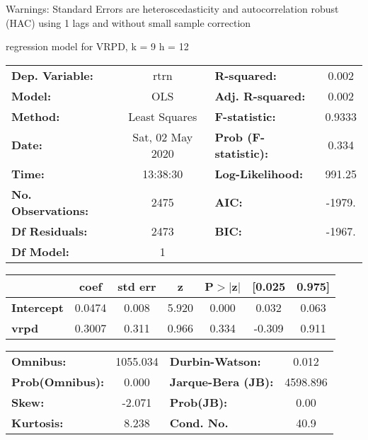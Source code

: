 Warnings: \newline
 [1] Standard Errors are heteroscedasticity and autocorrelation robust (HAC) using 1 lags and without small sample correction\ 

regression model for VRPD, k = 9 h = 12\begin{center}
\begin{tabular}{lclc}
\toprule
\textbf{Dep. Variable:}    &       rtrn       & \textbf{  R-squared:         } &     0.002   \\
\textbf{Model:}            &       OLS        & \textbf{  Adj. R-squared:    } &     0.002   \\
\textbf{Method:}           &  Least Squares   & \textbf{  F-statistic:       } &    0.9333   \\
\textbf{Date:}             & Sat, 02 May 2020 & \textbf{  Prob (F-statistic):} &    0.334    \\
\textbf{Time:}             &     13:38:30     & \textbf{  Log-Likelihood:    } &    991.25   \\
\textbf{No. Observations:} &        2475      & \textbf{  AIC:               } &    -1979.   \\
\textbf{Df Residuals:}     &        2473      & \textbf{  BIC:               } &    -1967.   \\
\textbf{Df Model:}         &           1      & \textbf{                     } &             \\
\bottomrule
\end{tabular}
\begin{tabular}{lcccccc}
                   & \textbf{coef} & \textbf{std err} & \textbf{z} & \textbf{P$> |$z$|$} & \textbf{[0.025} & \textbf{0.975]}  \\
\midrule
\textbf{Intercept} &       0.0474  &        0.008     &     5.920  &         0.000        &        0.032    &        0.063     \\
\textbf{vrpd}      &       0.3007  &        0.311     &     0.966  &         0.334        &       -0.309    &        0.911     \\
\bottomrule
\end{tabular}
\begin{tabular}{lclc}
\textbf{Omnibus:}       & 1055.034 & \textbf{  Durbin-Watson:     } &    0.012  \\
\textbf{Prob(Omnibus):} &   0.000  & \textbf{  Jarque-Bera (JB):  } & 4598.896  \\
\textbf{Skew:}          &  -2.071  & \textbf{  Prob(JB):          } &     0.00  \\
\textbf{Kurtosis:}      &   8.238  & \textbf{  Cond. No.          } &     40.9  \\
\bottomrule
\end{tabular}
\end{center}

